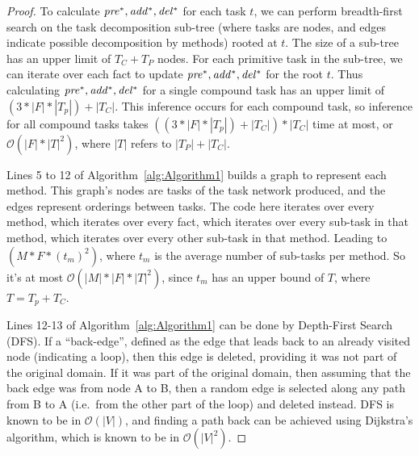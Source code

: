 \begin{proof}  %
	To calculate $\mathit{pre^{*}}, \mathit{add^{*}}, \mathit{del^{*}}$ for each task $t$, we can perform breadth-first search on the task decomposition sub-tree (where tasks are nodes, and edges indicate possible decomposition by methods) rooted at $t$. The size of a sub-tree has an upper limit of $T_C + T_P$ nodes. For each primitive task in the sub-tree, we can iterate over each fact to update $\mathit{pre^{*}}, \mathit{add^{*}}, \mathit{del^{*}}$ for the root $t$. Thus calculating  $\mathit{pre^{*}}, \mathit{add^{*}}, \mathit{del^{*}}$ for a single compound task has an upper limit of $(3 * |F| * |T_p|) + |T_C|$. This inference occurs for each compound task, so inference for all compound tasks takes $((3 * |F| * |T_p|) + |T_C|) * |T_C|$ time at most, or $\mathcal{O}(|F| * |T|^2)$, where $|T|$ refers to $|T_P| + |T_C|$.
	
	
	Lines 5 to 12 of Algorithm~\ref{alg:Algorithm1} builds a graph to represent each method. This graph's nodes are tasks of the task network produced, and the edges represent orderings between tasks. The code here iterates over every method, which iterates over every fact, which iterates over every sub-task in that method, which iterates over every other sub-task in that method. Leading to $(M * F * (t_m)^2)$, where $t_m$ is the average number of sub-tasks per method. So it's at most $\mathcal{O}(|M| * |F| * |T|^2)$, since $t_m$ has an upper bound of $T$, where $T=T_p + T_C$.
	
	Lines 12-13 of Algorithm~\ref{alg:Algorithm1} can be done by Depth-First Search (DFS). If a \enquote{back-edge}, defined as the edge that leads back to an already visited node (indicating a loop), then this edge is deleted, providing it was not part of the original domain. If it was part of the original domain, then assuming that the back edge was from node A to B, then a random edge is selected along any path from B to A (i.e.\ from the other part of the loop) and deleted instead.
	DFS is known to be in $\mathcal{O}(|V|)$, and finding a path back can be achieved using Dijkstra's algorithm, which is known to be in $\mathcal{O}(|V|^2)$.
	

\end{proof}
